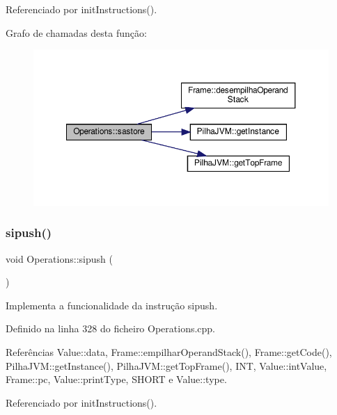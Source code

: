 Referenciado por init\+Instructions().

Grafo de chamadas desta função\+:
\nopagebreak
\begin{figure}[H]
\begin{center}
\leavevmode
\includegraphics[width=350pt]{classOperations_aab1c34c455478d75c21cdb06d6c94172_cgraph}
\end{center}
\end{figure}
\mbox{\label{classOperations_aed3838c73d7febfcacab9f101e6946ad}} 
\subsubsection{\texorpdfstring{sipush()}{sipush()}}
{\footnotesize\ttfamily void Operations\+::sipush (\begin{DoxyParamCaption}{ }\end{DoxyParamCaption})\hspace{0.3cm}{\ttfamily [private]}}



Implementa a funcionalidade da instrução sipush. 



Definido na linha 328 do ficheiro Operations.\+cpp.



Referências Value\+::data, Frame\+::empilhar\+Operand\+Stack(), Frame\+::get\+Code(), Pilha\+J\+V\+M\+::get\+Instance(), Pilha\+J\+V\+M\+::get\+Top\+Frame(), I\+NT, Value\+::int\+Value, Frame\+::pc, Value\+::print\+Type, S\+H\+O\+RT e Value\+::type.



Referenciado por init\+Instructions().

